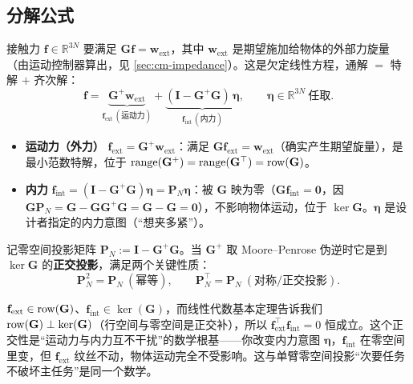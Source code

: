 \subsection{分解公式}
\label{sec:cm-internal-formula}
接触力 $\mathbf{f}\in\mathbb{R}^{3N}$ 要满足 $\mathbf{G}\mathbf{f}=\mathbf{w}_{\text{ext}}$，其中 $\mathbf{w}_{\text{ext}}$ 是期望施加给物体的外部力旋量（由运动控制器算出，见 \cref{sec:cm-impedance}）。这是欠定线性方程，通解 $=$ 特解 $+$ 齐次解：
\begin{equation}
\boxed{\;
  \mathbf{f}=\underbrace{\mathbf{G}^{+}\mathbf{w}_{\text{ext}}}_{\mathbf{f}_{\text{ext}}\,(\text{运动力})}
  +\underbrace{(\mathbf{I}-\mathbf{G}^{+}\mathbf{G})\,\boldsymbol{\eta}}_{\mathbf{f}_{\text{int}}\,(\text{内力})},
  \qquad \boldsymbol{\eta}\in\mathbb{R}^{3N}\ \text{任取}.
\;}
  \label{eq:cm-decomp}
\end{equation}
\begin{itemize}
  \item \textbf{运动力（外力）} $\mathbf{f}_{\text{ext}}=\mathbf{G}^{+}\mathbf{w}_{\text{ext}}$：满足 $\mathbf{G}\mathbf{f}_{\text{ext}}=\mathbf{w}_{\text{ext}}$（确实产生期望旋量），是最小范数特解，位于 $\operatorname{range}(\mathbf{G}^{+})=\operatorname{range}(\mathbf{G}^\top)=\operatorname{row}(\mathbf{G})$。
  \item \textbf{内力} $\mathbf{f}_{\text{int}}=(\mathbf{I}-\mathbf{G}^{+}\mathbf{G})\boldsymbol{\eta}=\mathbf{P}_N\boldsymbol{\eta}$：被 $\mathbf{G}$ 映为零（$\mathbf{G}\mathbf{f}_{\text{int}}=\mathbf{0}$，因 $\mathbf{G}\mathbf{P}_N=\mathbf{G}-\mathbf{G}\mathbf{G}^{+}\mathbf{G}=\mathbf{G}-\mathbf{G}=\mathbf{0}$），不影响物体运动，位于 $\ker\mathbf{G}$。$\boldsymbol{\eta}$ 是设计者指定的内力意图（“想夹多紧”）。
\end{itemize}
记零空间投影矩阵 $\mathbf{P}_N:=\mathbf{I}-\mathbf{G}^{+}\mathbf{G}$。当 $\mathbf{G}^{+}$ 取 Moore--Penrose 伪逆时它是到 $\ker\mathbf{G}$ 的\textbf{正交投影}，满足两个关键性质：
\begin{equation}
  \mathbf{P}_N^2=\mathbf{P}_N\ (\text{幂等}),\qquad \mathbf{P}_N^\top=\mathbf{P}_N\ (\text{对称/正交投影}).
  \label{eq:cm-PN-props}
\end{equation}

\begin{insight}
$\mathbf{f}_{\text{ext}}\in\operatorname{row}(\mathbf{G})$、$\mathbf{f}_{\text{int}}\in\ker(\mathbf{G})$，而线性代数基本定理告诉我们 $\operatorname{row}(\mathbf{G})\perp\ker(\mathbf{G})$（行空间与零空间是正交补），所以 $\mathbf{f}_{\text{ext}}^\top\mathbf{f}_{\text{int}}=0$ 恒成立。这个正交性是“运动力与内力互不干扰”的数学根基——你改变内力意图 $\boldsymbol{\eta}$，$\mathbf{f}_{\text{int}}$ 在零空间里变，但 $\mathbf{f}_{\text{ext}}$ 纹丝不动，物体运动完全不受影响。这与单臂零空间投影“次要任务不破坏主任务”是同一个数学。
\end{insight}

